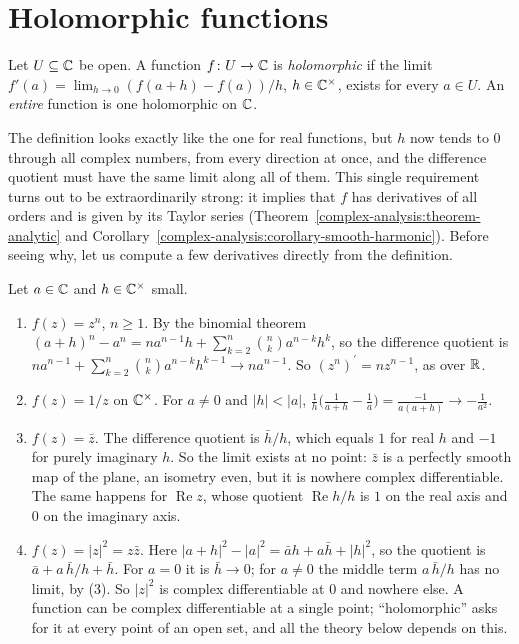 \section{Holomorphic functions}\label{complex-analysis:section-holomorphic}

\begin{definition}\label{complex-analysis:definition-holomorphic}
Let $U \subseteq \mathbb{C}$ be open. A function $f \colon U \to \mathbb{C}$ is \emph{holomorphic} if the limit $f'(a) = \lim_{h \to 0}(f(a + h) - f(a))/h$, $h \in \mathbb{C}^\times$, exists for every $a \in U$. An
\emph{entire} function is one holomorphic on $\mathbb{C}$.
\end{definition}

The definition looks exactly like the one for real functions, but $h$ now tends to $0$ through all complex numbers, from every direction at once, and the difference quotient must have the same limit
along all of them. This single requirement turns out to be extraordinarily strong: it implies that $f$ has derivatives of all orders and is given by its Taylor series
(Theorem~\ref{complex-analysis:theorem-analytic} and Corollary~\ref{complex-analysis:corollary-smooth-harmonic}). Before seeing why, let us compute a few derivatives directly from the definition.

\begin{example}\label{complex-analysis:example-derivative-definition}
Let $a \in \mathbb{C}$ and $h \in \mathbb{C}^\times$ small.
\begin{enumerate}
\item $f(z) = z^n$, $n \geq 1$. By the binomial theorem $(a + h)^n - a^n = na^{n-1}h + \sum_{k = 2}^n\binom nka^{n-k}h^k$, so the difference quotient is
$na^{n-1} + \sum_{k = 2}^n\binom nka^{n-k}h^{k-1} \to na^{n-1}$. So $(z^n)^{\prime} = nz^{n-1}$, as over $\mathbb{R}$.
\item $f(z) = 1/z$ on $\mathbb{C}^\times$. For $a \neq 0$ and $|h| < |a|$, $\frac1h\bigl(\frac1{a + h} - \frac1a\bigr) = \frac{-1}{a(a + h)} \to -\frac1{a^2}$.
\item $f(z) = \bar z$. The difference quotient is $\bar h/h$, which equals $1$ for real $h$ and $-1$ for purely imaginary $h$. So the limit exists at no point: $\bar z$ is a perfectly smooth map of the
plane, an isometry even, but it is nowhere complex differentiable. The same happens for $\operatorname{Re}z$, whose quotient $\operatorname{Re}h/h$ is $1$ on the real axis and $0$ on the imaginary
axis.
\item $f(z) = |z|^2 = z\bar z$. Here $|a + h|^2 - |a|^2 = \bar ah + a\bar h + |h|^2$, so the quotient is $\bar a + a\,\bar h/h + \bar h$. For $a = 0$ it is $\bar h \to 0$; for $a \neq 0$ the middle term
$a\,\bar h/h$ has no limit, by (3). So $|z|^2$ is complex differentiable at $0$ and nowhere else. A function can be complex differentiable at a single point; ``holomorphic'' asks for it at every point
of an open set, and all the theory below depends on this.
\end{enumerate}
\end{example}

